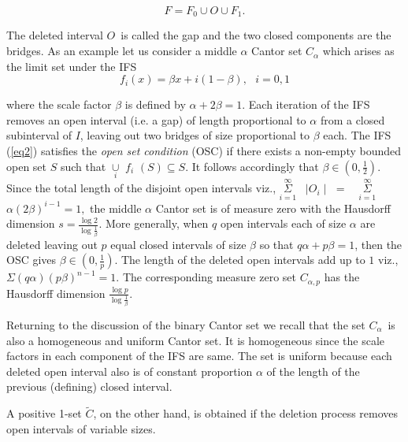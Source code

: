 \documentclass[12pt]{article}
\begin{document}
\begin{equation}\label{eq2}
F=F_{0}\cup O\cup F_{1}.
\end{equation}

The deleted interval $O$\ is called the gap and the two closed components
are the bridges. As an example let us consider a middle $\alpha $ Cantor set 
$C_{\alpha }$ which arises as the limit set under the IFS 
\begin{equation}\label{eq3}
f_{i}(x)=\beta x+i(1-\beta ),\text{ \ }i=0,1
\end{equation}

\noindent where the scale factor $\beta $ is defined by $\alpha +2\beta =1$.
Each iteration of the IFS  removes an open interval (i.e. a gap)
of length proportional to $\alpha $ from a closed subinterval  of $I$, leaving out two bridges of size proportional to $\beta $ each. The IFS (\ref{eq2}) satisfies
the {\em open set condition} (OSC)  if there exists a non-empty bounded open set $S$ such
that $\underset{i}{\cup }$ $f_i$ $(S)\subseteq S.$ It follows accordingly
that $\beta \in (0,\frac{1}{2}).$ Since the total length of the disjoint
open intervals viz., $\overset{\infty }{\underset{i=1}{\Sigma }}$ \ $\mid
O_{i}\mid $ $=$\ \ $\overset{\infty }{\underset{i=1}{\Sigma }}$ $\alpha
(2\beta )^{i-1}=1,$ the middle $\alpha $ Cantor set is of measure zero with
the Hausdorff dimension $s=\frac{\log 2}{\log \frac{1}{\beta }}$. More
generally, when $q$ open intervals each of size $\alpha $ are deleted
leaving out $p$ equal closed intervals of size $\beta $ so that $q\alpha
+p\beta =1$, then the OSC gives $\beta \in (0,\frac{1}{p}).$ The length
of the deleted open intervals add up to $1$ viz., $\Sigma (q\alpha )(p\beta
)^{n-1}=1.$ The corresponding measure zero set $C_{\alpha ,p}$ has the
Hausdorff dimension $\frac{\log p}{\log \frac{1}{\beta }}.$

\vspace{.25cm}

Returning to the discussion of the binary Cantor set we recall that the set $%
C_{\alpha }$\ is also a homogeneous and uniform Cantor set. It is
homogeneous since the scale factors in each component of the IFS are same. The set is uniform because each deleted open
interval also is of constant proportion $\alpha $ of the length of the
previous (defining) closed interval.

\vspace{.25cm}

A positive 1-set $\tilde{C}$, on the other hand, is obtained if the deletion
process removes open intervals of variable sizes.
\end{document}
